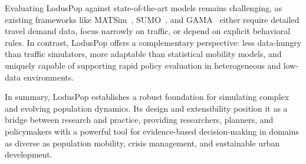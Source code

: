 \documentclass[pdflatex,sn-mathphys-num]{sn-jnl}%
\theoremstyle{thmstyleone}%
\theoremstyle{thmstyletwo}%
\theoremstyle{thmstylethree}%
\begin{document}
Evaluating LodusPop against state-of-the-art models remains challenging, as existing frameworks like MATSim~\citep{balmer2009matsim}, SUMO~\citep{krajzewicz2012sumo}, and GAMA~\citep{taillandier2019gama} either require detailed travel demand data, focus narrowly on traffic, or depend on explicit behavioral rules. In contrast, LodusPop offers a complementary perspective: less data-hungry than traffic simulators, more adaptable than statistical mobility models, and uniquely capable of supporting rapid policy evaluation in heterogeneous and low-data environments.

In summary, LodusPop establishes a robust foundation for simulating complex and evolving population dynamics. Its design and extensibility position it as a bridge between research and practice, providing researchers, planners, and policymakers with a powerful tool for evidence-based decision-making in domains as diverse as population mobility, crisis management, and sustainable urban development.
\end{document}
